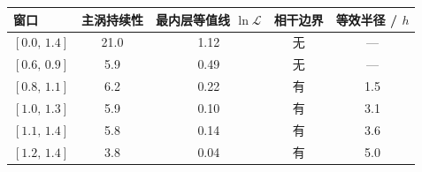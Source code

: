 \begin{tabular}{lcccc}\toprule 窗口 & 主涡持续性 & 最内层等值线 $\ln\mathcal L$ & 相干边界 & 等效半径 / $h$\\\midrule
{}$[0.0,\,1.4]$ & 21.0 & 1.12 & 无 & —\\
{}$[0.6,\,0.9]$ & 5.9 & 0.49 & 无 & —\\
{}$[0.8,\,1.1]$ & 6.2 & 0.22 & 有 & 1.5\\
{}$[1.0,\,1.3]$ & 5.9 & 0.10 & 有 & 3.1\\
{}$[1.1,\,1.4]$ & 5.8 & 0.14 & 有 & 3.6\\
{}$[1.2,\,1.4]$ & 3.8 & 0.04 & 有 & 5.0\\
\bottomrule\end{tabular}